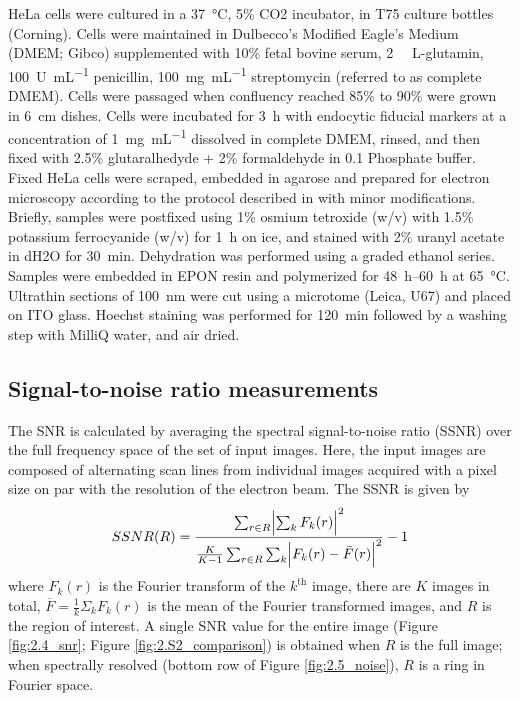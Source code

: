 HeLa cells were cultured in a \SI{37}{\celsius}, 5\% CO2 incubator, in T75 culture bottles (Corning). Cells were maintained in Dulbecco’s Modified Eagle’s Medium (DMEM; Gibco) supplemented with 10\% fetal bovine serum, \SI{2}{\milli\molar} L-glutamin, \SI{100}{U\per\milli\liter} penicillin, \SI{100}{\milli\gram\per\milli\liter} streptomycin (referred to as complete DMEM). Cells were passaged when confluency reached 85\% to 90\% were grown in \SI{6}{\centi\meter} dishes. Cells were incubated for \SI{3}{\hour} with endocytic fiducial markers at a concentration of \SI{1}{\milli\gram\per\milli\liter} dissolved in complete DMEM, rinsed, and then fixed with 2.5\% glutaralhedyde + 2\% formaldehyde in \SI{0.1}{\molar} Phosphate buffer. Fixed HeLa cells were scraped, embedded in agarose and prepared for electron microscopy according to the protocol described in \cite{fokkema2018fluorescently} with minor modifications. Briefly, samples were postfixed using 1\% osmium tetroxide (w/v) with 1.5\% potassium ferrocyanide (w/v) for \SI{1}{\hour} on ice, and stained with 2\% uranyl acetate in dH2O for \SI{30}{\minute}. Dehydration was performed using a graded ethanol series. Samples were embedded in EPON resin and polymerized for \SIrange{48}{60}{\hour} at \SI{65}{\celsius}. Ultrathin sections of \SI{100}{\nano\meter} were cut using a microtome (Leica, U67) and placed on ITO glass. Hoechst staining was performed for \SI{120}{\minute} followed by a washing step with MilliQ water, and air dried.


\subsection{Signal-to-noise ratio measurements}
\label{sec:3.4.3_snr}

The SNR is calculated by averaging the spectral signal-to-noise ratio (SSNR) \cite{unser1987new} over the full frequency space of the set of input images. Here, the input images are composed of alternating scan lines from individual images acquired with a pixel size on par with the resolution of the electron beam. The SSNR is given by
%
\begin{equation}
    SSNR(R) = \frac{\sum_{r \in R} \Bigl \lvert \sum_k F_k(r) \Bigr \rvert ^2}{\frac{K}{K-1} \sum_{r \in R} \sum_k \Bigl \lvert F_k(r) - \bar{F}(r) \Bigr \rvert ^2} - 1
\end{equation}
%
where $F_k(r)$ is the Fourier transform of the $k^{\text{th}}$ image, there are $K$ images in total, $\overline{F}=\frac{1}{k}\Sigma_k F_k(r)$ is the mean of the Fourier transformed images, and $R$ is the region of interest. A single SNR value for the entire image (Figure \ref{fig:2.4_snr}; Figure \ref{fig:2.S2_comparison}) is obtained when $R$ is the full image; when spectrally resolved (bottom row of Figure \ref{fig:2.5_noise}), $R$ is a ring in Fourier space.

